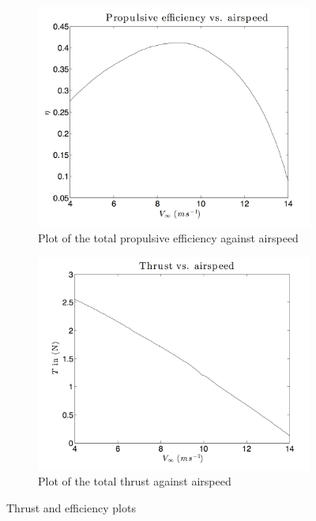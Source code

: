 \documentclass[11pt]{article}
\begin{document}
    \begin{figure}[h!]
    	\centering
    	\begin{subfigure}[b]{0.49\textwidth}
    		\includegraphics[width=\textwidth]{Figures/PS3/Teff.png}
    		\caption{Plot of the total propulsive efficiency against airspeed}
    	\end{subfigure}
    	\begin{subfigure}[b]{0.49\textwidth}
    		\includegraphics[width=\textwidth]{Figures/PS3/Thrust.png}
    		\caption{Plot of the total thrust against airspeed}
        \end{subfigure}%
        \caption{Thrust and efficiency plots}\label{fig:teff-thrust}
    \end{figure}
\end{document}
